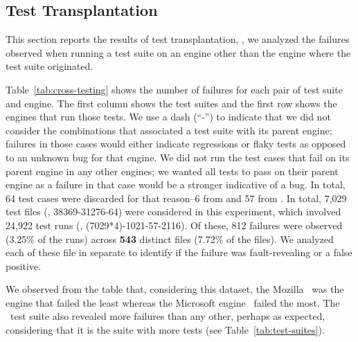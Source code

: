 \documentclass[10pt,conference,anonymous]{IEEEtran}
\begin{document}
\subsection{Test Transplantation}
\label{sec:transplantation}


This section reports the results of test transplantation, \ie{}, we
analyzed the failures observed when running a test suite on an engine
other than the engine where the test suite
originated.

Table~\ref{tab:cross-testing} shows the number of failures for each
pair of test suite and engine. The first column shows the test suites
and the first row shows the engines that run those tests. We use a
dash (``-'') to indicate that we did not consider the combinations
that associated a test suite with its parent engine; failures in those
cases would either indicate regressions or flaky tests as opposed to
an unknown bug for that engine. We did not run the test cases that
fail on its parent engine in any other engines; we wanted all tests to
pass on their parent engine as a failure in that case would be a
stronger indicative of a bug. In total, 64 test cases were discarded
for that reason--6 from \jsc{} and 57 from \smonkey. In total, 7,029
test files (\ie{}, 38369-31276-64) were considered in this experiment,
which involved 24,922 test runs (\ie, (7029*4)-1021-57-2116).  Of
these, 812 failures were observed (3.25\% of the runs) across
\textbf{543} distinct files (7.72\% of the files). We analyzed each of
these file in separate to identify if the failure was fault-revealing
or a false positive.

We observed from the table that, considering this dataset, the Mozilla
\smonkey\ was the engine that failed the least whereas the Microsoft
engine \chakra\ failed the most. The \smonkey\ test suite also
revealed more failures than any other, perhaps as expected,
considering that it is the suite with more tests (see
Table~\ref{tab:test-suites}).
\end{document}
